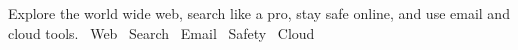   {Explore the world wide web, search like a pro, stay safe online, and use email and cloud tools.}
  {\faGlobe\ Web \quad \faSearch\ Search \quad \faEnvelope\ Email \quad \faLock\ Safety \quad \faCloud\ Cloud}
